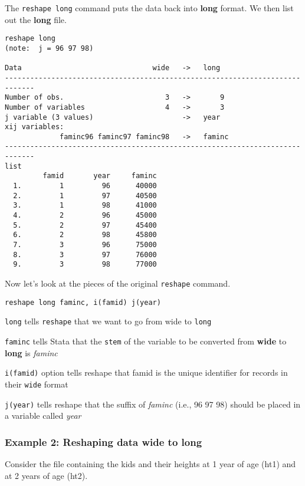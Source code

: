 The \lstinline{reshape long} command puts the data back into \textbf{long} format. We then list out the \textbf{long} file.

\begin{lstlisting}
reshape long
(note:  j = 96 97 98)

Data                               wide   ->   long
-----------------------------------------------------------------------------
Number of obs.                        3   ->       9
Number of variables                   4   ->       3
j variable (3 values)                     ->   year
xij variables:
             faminc96 faminc97 faminc98   ->   faminc
-----------------------------------------------------------------------------
list
         famid       year     faminc
  1.         1         96      40000
  2.         1         97      40500
  3.         1         98      41000
  4.         2         96      45000
  5.         2         97      45400
  6.         2         98      45800
  7.         3         96      75000
  8.         3         97      76000
  9.         3         98      77000
\end{lstlisting}

Now let's look at the pieces of the original \lstinline{reshape} command.

\begin{lstlisting}
reshape long faminc, i(famid) j(year)
\end{lstlisting}
\begin{compactitem}
\item \lstinline{long} tells \lstinline{reshape} that we want to go from wide to \lstinline{long}
\item \lstinline{faminc} tells Stata that the \lstinline{stem} of the variable to be converted from \textbf{wide} to \textbf{long} is \textit{faminc}
\item \lstinline{i(famid)} option tells reshape that famid is the unique identifier for records in their \lstinline{wide} format
\item \lstinline{j(year)} tells reshape that the suffix of \textit{faminc} (i.e., 96 97 98) should be placed in a variable called \textit{year}
\end{compactitem}

\subsubsection{Example 2: Reshaping data wide to long}
Consider the file containing the kids and their heights at 1 year of age (ht1) and at 2 years of age (ht2).

